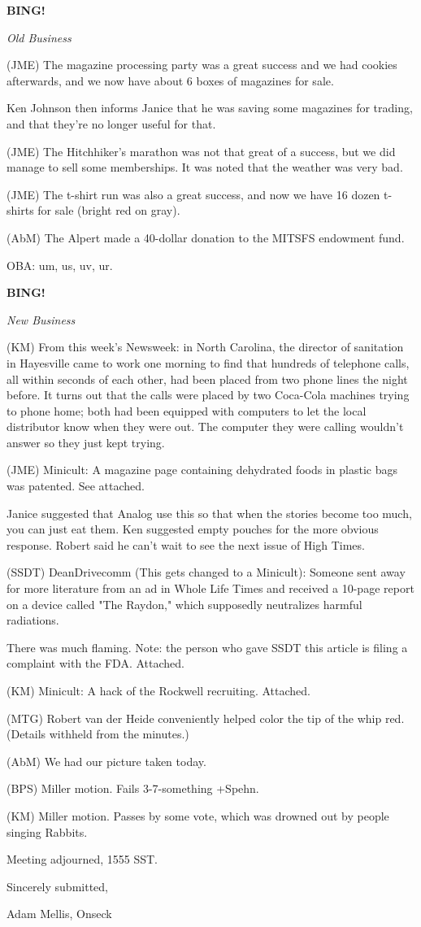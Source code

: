 \documentclass[12pt]{article}
\newcommand{\bing}{{\bf BING!} }
\newcommand{\goto}[1]{\bing \vskip 12pt \centerline{{\em{#1}}}}
\begin{document}
\goto{Old Business}

(JME) The magazine processing party was a great success and we had cookies afterwards, and we now have about 6 boxes of magazines for sale.

Ken Johnson then informs Janice that he was saving some magazines for trading, and that they're no longer useful for that.

(JME) The Hitchhiker's marathon was not that great of a success, but we did manage to sell some memberships. It was noted that the weather was very bad.

(JME) The t-shirt run was also a great success, and now we have 16 dozen t-shirts for sale (bright red on gray).

(AbM) The Alpert made a 40-dollar donation to the MITSFS endowment fund.

OBA: um, us, uv, ur.

\goto{New Business}

(KM) From this week's Newsweek: in North Carolina, the director of sanitation in Hayesville came to work one morning to find that hundreds of telephone calls, all within seconds of each other, had been placed from two phone lines the night before. It turns out that the calls were placed by two Coca-Cola machines trying to phone home; both had been equipped with computers to let the local distributor know when they were out. The computer they were calling wouldn't answer so they just kept trying.

(JME) Minicult: A magazine page containing dehydrated foods in plastic bags was patented. See attached.

Janice suggested that Analog use this so that when the stories become too much, you can just eat them. Ken suggested empty pouches for the more obvious response. Robert said he can't wait to see the next issue of High Times.

(SSDT) DeanDrivecomm (This gets changed to a Minicult): Someone sent away for more literature from an ad in Whole Life Times and received a 10-page report on a device called "The Raydon," which supposedly neutralizes harmful radiations.

There was much flaming. Note: the person who gave SSDT this article is filing a complaint with the FDA. Attached.

(KM) Minicult: A hack of the Rockwell recruiting. Attached.

(MTG) Robert van der Heide conveniently helped color the tip of the whip red. (Details withheld from the minutes.)

(AbM) We had our picture taken today.

(BPS) Miller motion. Fails 3-7-something +Spehn.

(KM) Miller motion. Passes by some vote, which was drowned out by people singing Rabbits.

\vspace{12pt}

\noindent
Meeting adjourned, 1555 SST.

\vspace{18pt}

\centerline{Sincerely submitted,}
\centerline{Adam Mellis, Onseck}
\end{document}
